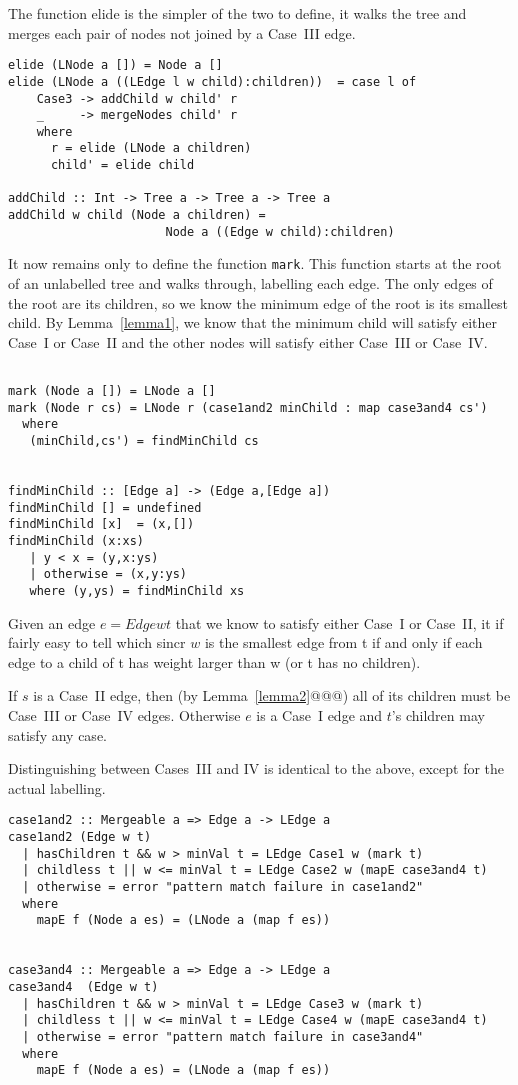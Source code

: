 \documentclass{jfp}
\begin{document}
The function elide is the simpler of the two to define, it walks the
tree and merges each pair of nodes not joined by a Case~III edge.

\begin{verbatim}
elide (LNode a []) = Node a []
elide (LNode a ((LEdge l w child):children))  = case l of
    Case3 -> addChild w child' r
    _     -> mergeNodes child' r
    where
      r = elide (LNode a children)
      child' = elide child

addChild :: Int -> Tree a -> Tree a -> Tree a
addChild w child (Node a children) =
                      Node a ((Edge w child):children)

\end{verbatim}

It now remains only to define the function {\tt mark}. This function
starts at the root of an unlabelled tree and walks through, labelling
each edge. The only edges of the root are its children, so we know the
minimum edge of the root is its smallest child. By Lemma~\ref{lemma1}, we know
that the minimum child will satisfy either Case~I or Case~II and the
other nodes will satisfy either Case~III or Case~IV.

\begin{verbatim}

mark (Node a []) = LNode a []
mark (Node r cs) = LNode r (case1and2 minChild : map case3and4 cs')
  where
   (minChild,cs') = findMinChild cs


findMinChild :: [Edge a] -> (Edge a,[Edge a])
findMinChild [] = undefined
findMinChild [x]  = (x,[])
findMinChild (x:xs)
   | y < x = (y,x:ys)
   | otherwise = (x,y:ys)
   where (y,ys) = findMinChild xs
\end{verbatim}

Given an edge $e = Edge w t$ that we know to satisfy either Case~I or
Case~II, it if fairly easy to tell which sincr $w$ is the smallest
edge from t if and only if each edge to a child of t has weight larger
than w (or t has no children).

If $s$ is a Case~II edge, then (by Lemma~\ref{lemma2}@@@) all of its
children must be Case~III or Case~IV edges.  Otherwise $e$ is a Case~I
edge and $t$'s children may satisfy any case.

Distinguishing between Cases~III and IV is identical to the above,
except for the actual labelling.

\begin{verbatim}
case1and2 :: Mergeable a => Edge a -> LEdge a
case1and2 (Edge w t)
  | hasChildren t && w > minVal t = LEdge Case1 w (mark t)
  | childless t || w <= minVal t = LEdge Case2 w (mapE case3and4 t)
  | otherwise = error "pattern match failure in case1and2"
  where
    mapE f (Node a es) = (LNode a (map f es))


case3and4 :: Mergeable a => Edge a -> LEdge a
case3and4  (Edge w t)
  | hasChildren t && w > minVal t = LEdge Case3 w (mark t)
  | childless t || w <= minVal t = LEdge Case4 w (mapE case3and4 t)
  | otherwise = error "pattern match failure in case3and4"
  where
    mapE f (Node a es) = (LNode a (map f es))
\end{verbatim}
\end{document}
